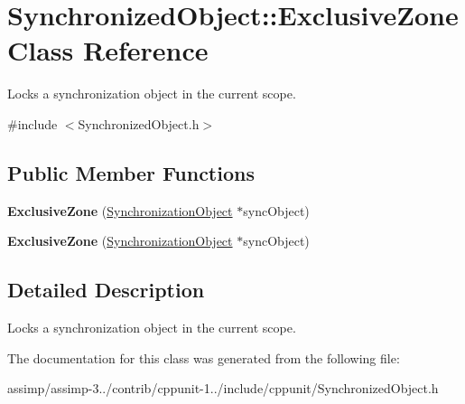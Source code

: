 \hypertarget{class_synchronized_object_1_1_exclusive_zone}{\section{Synchronized\+Object\+:\+:Exclusive\+Zone Class Reference}
\label{class_synchronized_object_1_1_exclusive_zone}
}


Locks a synchronization object in the current scope.  




{\ttfamily \#include $<$Synchronized\+Object.\+h$>$}

\subsection*{Public Member Functions}
\begin{DoxyCompactItemize}
\item 
\hypertarget{class_synchronized_object_1_1_exclusive_zone_ae4393b508828328c2f4816ff9b7b090c}{{\bfseries Exclusive\+Zone} (\hyperlink{class_synchronized_object_1_1_synchronization_object}{Synchronization\+Object} $\ast$sync\+Object)}\label{class_synchronized_object_1_1_exclusive_zone_ae4393b508828328c2f4816ff9b7b090c}

\item 
\hypertarget{class_synchronized_object_1_1_exclusive_zone_ae4393b508828328c2f4816ff9b7b090c}{{\bfseries Exclusive\+Zone} (\hyperlink{class_synchronized_object_1_1_synchronization_object}{Synchronization\+Object} $\ast$sync\+Object)}\label{class_synchronized_object_1_1_exclusive_zone_ae4393b508828328c2f4816ff9b7b090c}

\end{DoxyCompactItemize}


\subsection{Detailed Description}
Locks a synchronization object in the current scope. 

The documentation for this class was generated from the following file\+:\begin{DoxyCompactItemize}
\item 
assimp/assimp-\/3../contrib/cppunit-\/1../include/cppunit/Synchronized\+Object.\+h\end{DoxyCompactItemize}
